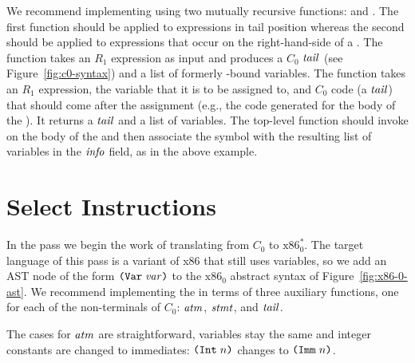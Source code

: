\documentclass[11pt]{book}
\begin{document}
We recommend implementing  using two mutually
recursive functions:  and
.  The first function should be applied to
expressions in tail position whereas the second should be applied to
expressions that occur on the right-hand-side of a . The
 function takes an $R_1$ expression as input and
produces a $C_0$ $\mathit{tail}$ (see Figure~\ref{fig:c0-syntax}) and a list
of formerly -bound variables. The 
function takes an $R_1$ expression, the variable that it is to be
assigned to, and $C_0$ code (a $\mathit{tail}$) that should come after the
assignment (e.g., the code generated for the body of the ).
It returns a $\mathit{tail}$ and a list of variables. The top-level
 function should invoke 
on the body of the  and then associate the 
symbol with the resulting list of variables in the $\mathit{info}$ field,
as in the above example.

\section{Select Instructions}
\label{sec:select-r1}

In the  pass we begin the work of
translating from $C_0$ to $\text{x86}^{*}_0$. The target language of
this pass is a variant of x86 that still uses variables, so we add an
AST node of the form $\texttt{(Var}\;\mathit{var}\texttt{)}$ to the $\text{x86}_0$ abstract
syntax of Figure~\ref{fig:x86-0-ast}.  We recommend implementing the
 in terms of three auxiliary functions, one
for each of the non-terminals of $C_0$: $\mathit{atm}$, $\mathit{stmt}$, and $\mathit{tail}$.

The cases for $\mathit{atm}$ are straightforward, variables stay
the same and integer constants are changed to immediates:
$\texttt{(Int}\;n\texttt{)}$ changes to $\texttt{(Imm}\;n\texttt{)}$.
\end{document}
